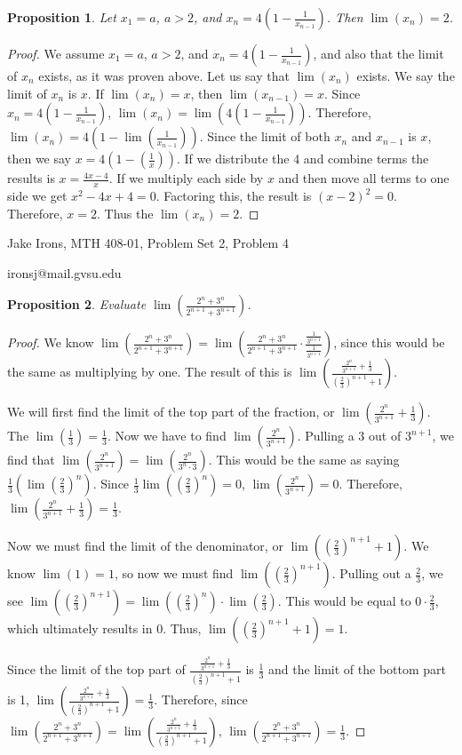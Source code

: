 \documentclass[11 pt]{article}
\newtheorem{proposition}{Proposition}
\newcommand{\newpar}{\vspace{.15in}\noindent}
\begin{document}
\newpar
\begin{proposition}
Let $x_1=a$, $a>2$, and $x_n=4(1-\frac{1}{x_{n-1}})$. Then $\lim(x_n)=2$.
\end{proposition}
\begin{proof}
\newpar 
We assume $x_1=a$, $a>2$, and $x_n=4(1-\frac{1}{x_{n-1}})$, and also that the limit of $x_n$ exists, as it was proven above. Let us say that $\lim(x_n)$ exists. We say the limit of $x_n$ is $x$. If $\lim(x_n)=x$, then $\lim(x_{n-1})=x$. Since $x_n=4(1-\frac{1}{x_{n-1}})$, $\lim(x_n)=\lim(4(1-\frac{1}{x_{n-1}}))$. Therefore, $\lim(x_n)= 4(1-\lim(\frac{1}{x_{n-1}}))$. Since the limit of both $x_n$ and $x_{n-1}$ is $x$, then we say $x= 4(1-(\frac{1}{x}))$. If we distribute the 4 and combine terms the results is $x=\frac{4x-4}{x}$. If we multiply each side by $x$ and then move all terms to one side we get $x^2-4x+4=0$. Factoring this, the result is $(x-2)^2=0$. Therefore, $x=2$. Thus the $\lim(x_n)=2$.
\end{proof}
\newpage
\noindent Jake Irons, MTH 408-01, Problem Set 2, Problem 4

\noindent ironsj@mail.gvsu.edu
\newpar
\begin{proposition}
Evaluate $\lim(\frac{2^n+3^n}{2^{n+1}+3^{n+1}})$.
\end{proposition}
\begin{proof}
We know $\lim(\frac{2^n+3^n}{2^{n+1}+3^{n+1}})=\lim(\frac{2^n+3^n}{2^{n+1}+3^{n+1}}\cdot \frac{\frac{1}{3^{n+1}}}{\frac{1}{3^{n+1}}})$, since this would be the same as multiplying by one. The result of this is $\lim(\frac{\frac{2^n}{3^{n+1}}+\frac{1}{3}}{(\frac{2}{3})^{n+1}+1})$.

\newpar
We will first find the limit of the top part of the fraction, or $\lim(\frac{2^n}{3^{n+1}}+\frac{1}{3})$. The $\lim(\frac{1}{3})=\frac{1}{3}$. Now we have to find $\lim(\frac{2^n}{3^{n+1}})$. Pulling a 3 out of $3^{n+1}$, we find that $\lim(\frac{2^n}{3^{n+1}})=\lim(\frac{2^n}{3^n\cdot3})$. This would be the same as saying $\frac{1}{3}(\lim(\frac{2}{3})^n)$. Since $\frac{1}{3}\lim((\frac{2}{3})^n)=0$, $\lim(\frac{2^n}{3^{n+1}})=0$. Therefore, $\lim(\frac{2^n}{3^{n+1}}+\frac{1}{3})=\frac{1}{3}$.

\newpar
Now we must find the limit of the denominator, or $\lim((\frac{2}{3})^{n+1}+1)$. We know $\lim(1)=1$, so now we must find $\lim((\frac{2}{3})^{n+1})$. Pulling out a $\frac{2}{3}$, we see $\lim((\frac{2}{3})^{n+1})=\lim((\frac{2}{3})^n)\cdot\lim(\frac{2}{3})$. This would be equal to $0\cdot\frac{2}{3}$, which ultimately results in 0. Thus, $\lim((\frac{2}{3})^{n+1}+1)=1$. 

\newpar
Since the limit of the top part of $\frac{\frac{2^n}{3^{n+1}}+\frac{1}{3}}{(\frac{2}{3})^{n+1}+1}$ is $\frac{1}{3}$ and the limit of the bottom part is 1, $\lim(\frac{\frac{2^n}{3^{n+1}}+\frac{1}{3}}{(\frac{2}{3})^{n+1}+1})=\frac{1}{3}$. Therefore, since  $\lim(\frac{2^n+3^n}{2^{n+1}+3^{n+1}})=\lim(\frac{\frac{2^n}{3^{n+1}}+\frac{1}{3}}{(\frac{2}{3})^{n+1}+1})$, $\lim(\frac{2^n+3^n}{2^{n+1}+3^{n+1}})=\frac{1}{3}$.



\end{proof}
\end{document}
